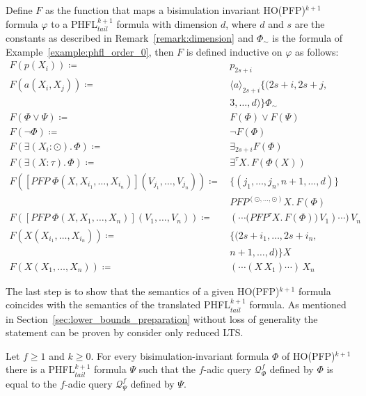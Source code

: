 \begin{definition}
    \label{definition:lower_bounds_phfl_formula_function_pfp}
   Define $F$ as the function that maps a bisimulation invariant HO(PFP)$^{k+1}$ formula $\varphi$ to a PHFL$^{k+1}_{tail}$ formula with dimension $d$, where $d$ and $s$ are the constants as described in Remark~\ref{remark:dimension} and $\Phi_\sim$ is the formula of Example~\ref{example:phfl_order_0}, then $F$ is defined
    inductive on $\varphi$ as follows:
    \begin{align*}
        F(p(X_i)) \coloneqq &\, p_{2s+i} \\
        F(a(X_i, X_j)) \coloneqq &\, \langle a \rangle_{2s+i} \{(2s+i, 2s+j, \\
        &\,3, \dots, d)\} \Phi_\sim \\
        F(\Phi \vee \Psi) \coloneqq &\, F(\Phi) \vee F(\Psi) \\
        F(\neg \Phi) \coloneqq &\, \neg F(\Phi) \\
        F(\exists (X_i \colon \odot).\,\Phi) \coloneqq &\, \exists_{2s+i} F(\Phi) \\
        F(\exists (X \colon \tau).\,\Phi) \coloneqq &\, \exists^\tau X.\,F(\Phi(X)) \\
        F([PFP\;\Phi(X, X_{i_1}, \dots, X_{i_n})](V_{j_1}, \dots, V_{j_n})) \coloneqq &\,\{(j_1, \dots, j_n, n + 1, \dots, d)\} \\
        &\,PFP^{(\odot, \dots, \odot)} X.\, F(\Phi) \\
        F([PFP\;\Phi(X, X_1, \dots, X_n)](V_1, \dots, V_n)) \coloneqq &\,(\dotsb \big(PFP^\tau X.\, F(\Phi)\big)\,V_1)\dotsb)\,V_n \\
        F(X(X_{i_1}, \dots, X_{i_n})) \coloneqq &\, \{(2s+i_1, \dots, 2s+i_n, \\
        &\,n + 1, \dots, d)\}X\\
        F(X(X_1, \dots, X_n)) \coloneqq &\, (\dotsb (X\,X_1)\dotsb)\,X_n
    \end{align*}
\end{definition}

The last step is to show that the semantics of a given HO(PFP)$^{k+1}$ formula coincides with the semantics of the translated PHFL$^{k+1}_{tail}$ formula. As mentioned in Section~\ref{sec:lower_bounds_preparation} without loss of generality the statement can be proven by consider only  reduced LTS. 

\begin{lemma}
    \label{lemma:ho_pfp_equals_phfl_tail}
    Let $f \geq 1$ and $k \geq 0$. For every bisimulation-invariant formula $\Phi$ of HO(PFP)$^{k + 1}$ there is a
    PHFL$^{k+1}_{tail}$ formula $\Psi$ such that the $f$-adic query $\mathcal{Q}_\Phi^f$ defined by $\Phi$ is equal to the $f$-adic query  $\mathcal{Q}_\Psi^f$ defined by $\Psi$.
\end{lemma}

